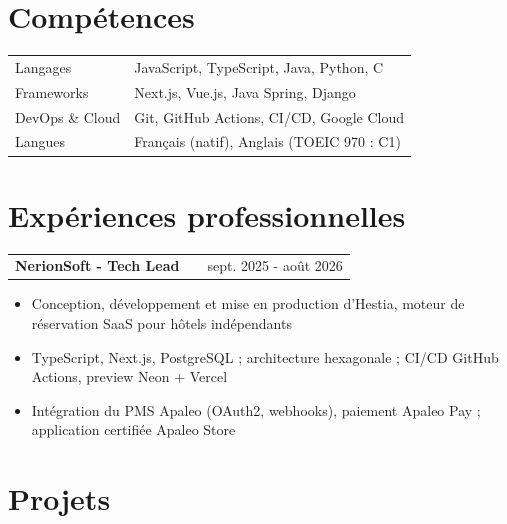\documentclass[a4paper,10pt]{article}
\makeatletter
\newenvironment{jobshort}[2]
    {
    \begin{tabularx}{\linewidth}{@{}l X r@{}}
    \textbf{#1} & \hfill &  #2 \\[3.75pt]
    \end{tabularx}
    }
    {
    }
\newenvironment{joblong}[2]
    {
    \begin{tabularx}{\linewidth}{@{}l X r@{}}
    \textbf{#1} & \hfill &  #2 \\[3.75pt]
    \end{tabularx}
    \begin{minipage}[t]{\linewidth}
    \begin{itemize}[nosep,after=\strut, leftmargin=1em, itemsep=2.5pt,label=--]
    }
    {
    \end{itemize}
    \end{minipage}    
    }
\makeatother
\begin{document}
\section{Compétences}
\begin{tabularx}{\linewidth}{@{}l X@{}}
Langages  &  \normalsize{JavaScript, TypeScript, Java, Python, C}\\
Frameworks  &  \normalsize{Next.js, Vue.js, Java Spring, Django}\\
DevOps \& Cloud  &  \normalsize{Git, GitHub Actions, CI/CD, Google Cloud}\\
Langues  &  \normalsize{Français (natif), Anglais (TOEIC 970 : C1)}\\
\end{tabularx}


\section{Expériences professionnelles}

\begin{joblong}{NerionSoft - Tech Lead}{sept. 2025 - août 2026}
    \item Conception, développement et mise en production d'Hestia, moteur de réservation SaaS pour hôtels indépendants
    \item TypeScript, Next.js, PostgreSQL ; architecture hexagonale ; CI/CD GitHub Actions, preview Neon + Vercel
    \item Intégration du PMS Apaleo (OAuth2, webhooks), paiement Apaleo Pay ; application certifiée Apaleo Store
\end{joblong}


\section{Projets}
\end{document}
